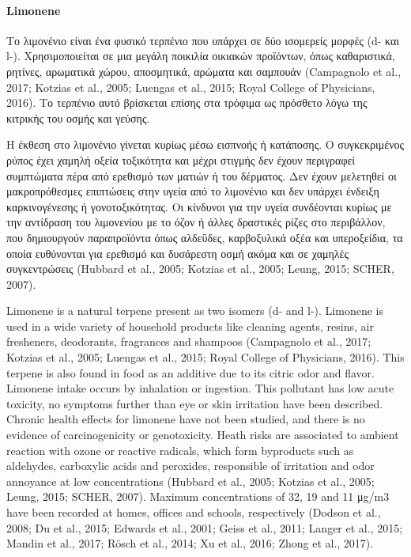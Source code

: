 \paragraph{Limonene}

Το λιμονένιο είναι ένα φυσικό τερπένιο που υπάρχει σε δύο ισομερείς μορφές (d- και l-). Χρησιμοποιείται σε μια μεγάλη ποικιλία οικιακών προϊόντων, όπως καθαριστικά, ρητίνες, αρωματικά χώρου, αποσμητικά, αρώματα και σαμπουάν (Campagnolo et al., 2017; Kotzias et al., 2005; Luengas et al., 2015; Royal College of Physicians, 2016). Το τερπένιο αυτό βρίσκεται επίσης στα τρόφιμα ως πρόσθετο λόγω της κιτρικής του οσμής και γεύσης.

Η έκθεση στο λιμονένιο γίνεται κυρίως μέσω εισπνοής ή κατάποσης. Ο συγκεκριμένος ρύπος έχει χαμηλή οξεία τοξικότητα και μέχρι στιγμής δεν έχουν περιγραφεί συμπτώματα πέρα από ερεθισμό των ματιών ή του δέρματος. Δεν έχουν μελετηθεί οι μακροπρόθεσμες επιπτώσεις στην υγεία από το λιμονένιο και δεν υπάρχει ένδειξη καρκινογένεσης ή γονοτοξικότητας. Οι κίνδυνοι για την υγεία συνδέονται κυρίως με την αντίδραση του λιμονενίου με το όζον ή άλλες δραστικές ρίζες στο περιβάλλον, που δημιουργούν παραπροϊόντα όπως αλδεΰδες, καρβοξυλικά οξέα και υπεροξείδια, τα οποία ευθύνονται για ερεθισμό και δυσάρεστη οσμή ακόμα και σε χαμηλές συγκεντρώσεις (Hubbard et al., 2005; Kotzias et al., 2005; Leung, 2015; SCHER, 2007).

Limonene is a natural terpene present as two isomers (d- and l-). Limonene is used in a wide variety of household products like cleaning agents, resins, air fresheners, deodorants, fragrances and shampoos (Campagnolo et al., 2017; Kotzias et al., 2005; Luengas et al., 2015; Royal College of Physicians, 2016). This terpene is also found in food as an additive due to its citric odor and flavor. Limonene intake occurs by inhalation or ingestion. This pollutant has low acute toxicity, no symptoms further than eye or skin irritation have been described. Chronic health effects for limonene have not been studied, and there is no evidence of carcinogenicity or genotoxicity. Heath risks are associated to ambient reaction with ozone or reactive radicals, which form byproducts such as aldehydes, carboxylic acids and peroxides, responsible of irritation and odor annoyance at low concentrations (Hubbard et al., 2005; Kotzias et al., 2005; Leung, 2015; SCHER, 2007). Maximum concentrations of 32, 19 and 11 μg/m3 have been recorded at homes, offices and schools, respectively (Dodson et al., 2008; Du et al., 2015; Edwards et al., 2001; Geiss et al., 2011; Langer et al., 2015; Mandin et al., 2017; Rösch et al., 2014; Xu et al., 2016; Zhong et al., 2017).



